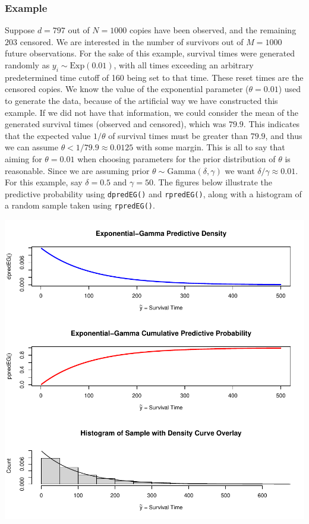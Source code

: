 \documentclass[12pt, a4paper]{article}
\begin{document}
    \subsubsection{Example}

\noindent Suppose $d=797$ out of $N = 1000$ copies have been observed, and the remaining $203$ censored. We are interested in the number of survivors out of $M = 1000$ future observations.  For the sake of this example, survival times were generated randomly as $y_i \sim \text{Exp}(0.01)$, with all times exceeding an arbitrary predetermined time cutoff of 160 being set to that time.  These reset times are the censored copies.  We know the value of the exponential parameter ($\theta = 0.01$) used to generate the data, because of the artificial way we have constructed this example.  If we did not have that information, we could consider the mean of the generated survival times (observed and censored), which was $79.9$.  This indicates that the expected value $1/\theta$ of survival times must be greater than $79.9$, and thus we can assume $\theta < 1/79.9 \approx 0.0125$ with some margin.  This is all to say that aiming for $\theta = 0.01$ when choosing parameters for the prior distribution of $\theta$ is reasonable.  Since we are assuming prior $\theta\sim\text{Gamma}(\delta,\gamma)$ we want $\delta/\gamma \approx 0.01$.   For this example, say $\delta = 0.5$ and $\gamma=50$.  The figures below illustrate the predictive probability using \texttt{dpredEG()} and \texttt{rpredEG()}, along with a histogram of a random sample taken using \texttt{rpredEG()}.



\includegraphics{Thesis_v3-004}
\end{document}
